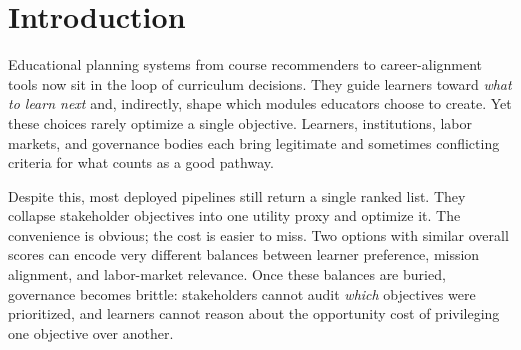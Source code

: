 \documentclass{article}
\newcommand{\MAPE}{\textsc{MAPE}\xspace}
\begin{document}

\section{Introduction}

Educational planning systems   from course recommenders to career-alignment tools   now sit in the loop of curriculum decisions. They guide learners toward \emph{what to learn next} and, indirectly, shape which modules educators choose to create. Yet these choices rarely optimize a single objective. Learners, institutions, labor markets, and governance bodies each bring legitimate   and sometimes conflicting   criteria for what counts as a good pathway.

Despite this, most deployed pipelines still return a single ranked list. They collapse stakeholder objectives into one utility proxy and optimize it. The convenience is obvious; the cost is easier to miss. Two options with similar overall scores can encode very different balances between learner preference, mission alignment, and labor-market relevance. Once these balances are buried, governance becomes brittle: stakeholders cannot audit \emph{which} objectives were prioritized, and learners cannot reason about the opportunity cost of privileging one objective over another.
\end{document}
